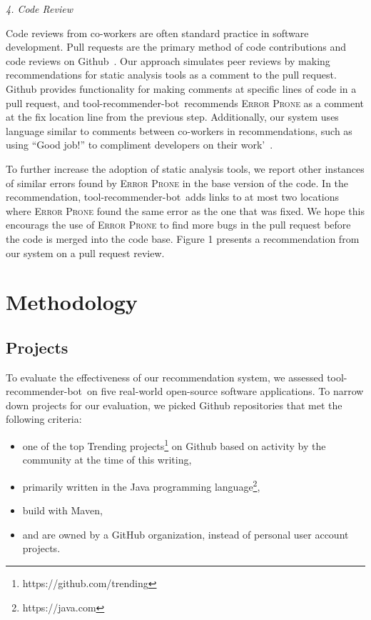 \documentclass[conference]{IEEEtran}
\newcommand{\tool}{tool-recommender-bot}
\newcommand{\pseudosubsection}[1]{\vspace{2mm} {\it #1}}
\begin{document}
\pseudosubsection{4. Code Review}

Code reviews from co-workers are often standard practice in software development. Pull requests are the primary method of code contributions and code reviews on Github~\cite{PullRequestReview}. Our approach simulates peer reviews by making recommendations for static analysis tools as a comment to the pull request. Github provides functionality for making comments at specific lines of code in a pull request, and \tool~recommends \textsc{Error Prone} as a comment at the fix location line from the previous step. Additionally, our system  uses language similar to comments between co-workers in recommendations, such as using ``Good job!'' to compliment developers on their work'~\cite{?}.

To further increase the adoption of static analysis tools, we report other instances of similar errors found by \textsc{Error Prone} in the base version of the code. In the recommendation, \tool~adds links to at most two locations where \textsc{Error Prone} found the same error as the one that was fixed. We hope this encourags the use of \textsc{Error Prone} to find more bugs in the pull request before the code is merged into the code base. Figure 1 presents a recommendation from our system on a pull request review.

\section{Methodology}

\subsection{Projects}

To evaluate the effectiveness of our recommendation system, we assessed \tool~on five real-world open-source software applications. To narrow down projects for our evaluation, we picked Github repositories that met the following criteria:

\begin{itemize}
\item one of the top Trending projects\footnote{https://github.com/trending} on Github based on activity by the community at the time of this writing,
\item primarily written in the Java programming language\footnote{https://java.com},
\item build with Maven,
\item and are owned by a GitHub organization, instead of personal user account projects.
\end{itemize}
\end{document}
